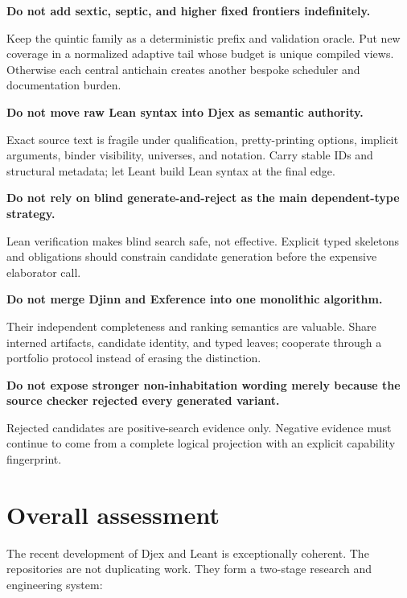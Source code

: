 \documentclass[11pt]{article}
\newcommand{\Djex}{\textsf{Djex}}
\newcommand{\Leant}{\textsf{Leant}}
\newenvironment{caution}[1]
{\par\medskip\noindent\colorbox{WarnBg}{\parbox{\dimexpr\linewidth-2\fboxsep\relax}{\sffamily\bfseries #1}}\par\smallskip}
{\par\medskip}
\begin{document}
\begin{caution}{Do not add sextic, septic, and higher fixed frontiers indefinitely.}
Keep the quintic family as a deterministic prefix and validation oracle.  Put
new coverage in a normalized adaptive tail whose budget is unique compiled
views.  Otherwise each central antichain creates another bespoke scheduler and
documentation burden.
\end{caution}

\begin{caution}{Do not move raw Lean syntax into Djex as semantic authority.}
Exact source text is fragile under qualification, pretty-printing options,
implicit arguments, binder visibility, universes, and notation.  Carry stable
IDs and structural metadata; let \Leant{} build Lean syntax at the final edge.
\end{caution}

\begin{caution}{Do not rely on blind generate-and-reject as the main dependent-type strategy.}
Lean verification makes blind search safe, not effective.  Explicit typed
skeletons and obligations should constrain candidate generation before the
expensive elaborator call.
\end{caution}

\begin{caution}{Do not merge Djinn and Exference into one monolithic algorithm.}
Their independent completeness and ranking semantics are valuable.  Share
interned artifacts, candidate identity, and typed leaves; cooperate through a
portfolio protocol instead of erasing the distinction.
\end{caution}

\begin{caution}{Do not expose stronger non-inhabitation wording merely because the source checker rejected every generated variant.}
Rejected candidates are positive-search evidence only.  Negative evidence must
continue to come from a complete logical projection with an explicit capability
fingerprint.
\end{caution}

\section{Overall assessment}

The recent development of \Djex{} and \Leant{} is exceptionally coherent.  The
repositories are not duplicating work.  They form a two-stage research and
engineering system:
\end{document}
